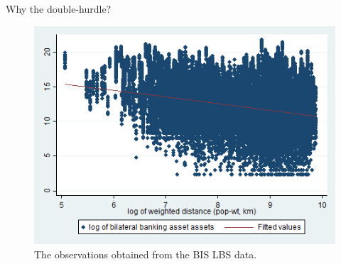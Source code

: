 \documentclass{beamer}
\begin{document}
\begin{frame}{Why the double-hurdle?} 
\begin{figure}
\includegraphics[width=\textwidth]{scatter_lfit_log_ba_od_log_distw.png}
\caption{\label{fig2}The observations obtained from the BIS LBS data.}
\end{figure}
\end{frame}
\end{document}

